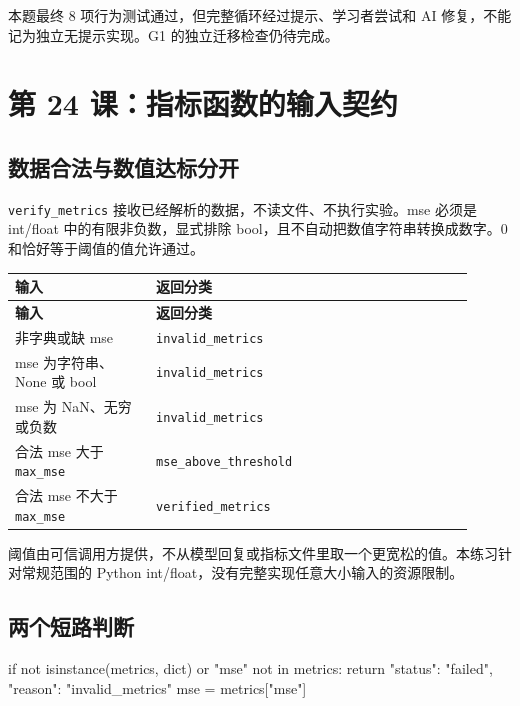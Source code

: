 本题最终 8 项行为测试通过，但完整循环经过提示、学习者尝试和 AI 修复，不能记为独立无提示实现。G1 的独立迁移检查仍待完成。

\section{第 24 课：指标函数的输入契约}

\subsection{数据合法与数值达标分开}

\nolinkurl{verify_metrics} 接收已经解析的数据，不读文件、不执行实验。mse 必须是 int/float 中的有限非负数，显式排除 bool，且不自动把数值字符串转换成数字。0 和恰好等于阈值的值允许通过。

{\small\setlength{\tabcolsep}{4pt}
\renewcommand{\arraystretch}{1.25}
\begin{longtable}{>{\raggedright\arraybackslash}p{0.28\linewidth}>{\raggedright\arraybackslash}p{0.63\linewidth}}
\toprule
\textbf{输入} & \textbf{返回分类} \\
\midrule\endfirsthead
\toprule
\textbf{输入} & \textbf{返回分类} \\
\midrule\endhead
\bottomrule\endfoot
非字典或缺 mse & \nolinkurl{invalid_metrics} \\
mse 为字符串、None 或 bool & \nolinkurl{invalid_metrics} \\
mse 为 NaN、无穷或负数 & \nolinkurl{invalid_metrics} \\
合法 mse 大于 \nolinkurl{max_mse} & \nolinkurl{mse_above_threshold} \\
合法 mse 不大于 \nolinkurl{max_mse} & \nolinkurl{verified_metrics} \\
\end{longtable}}

阈值由可信调用方提供，不从模型回复或指标文件里取一个更宽松的值。本练习针对常规范围的 Python int/float，没有完整实现任意大小输入的资源限制。

\subsection{两个短路判断}

\begin{Code}
if not isinstance(metrics, dict) or "mse" not in metrics:
    return {"status": "failed", "reason": "invalid_metrics"}
mse = metrics["mse"]
\end{Code}

